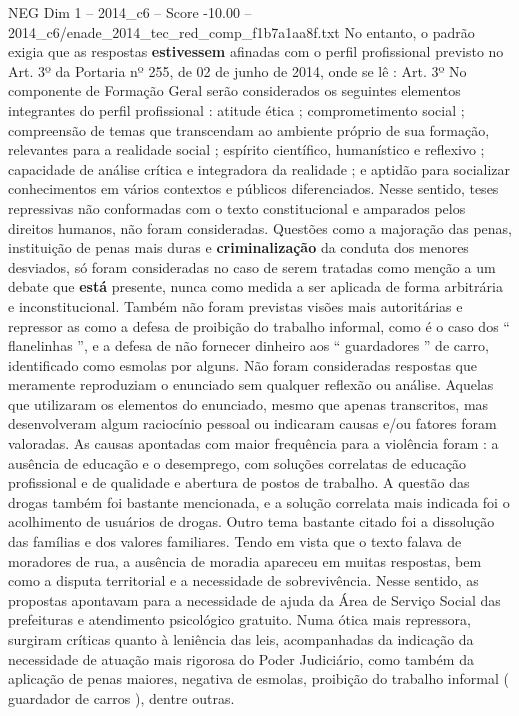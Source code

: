 \begin{textsample}{NEG Dim 1 – 2014\_c6 – Score -10.00 – 2014\_c6/enade\_2014\_tec\_red\_comp\_f1b7a1aa8f.txt}
No entanto, o padrão exigia que as respostas \textbf{estivessem} afinadas com o perfil profissional previsto no Art. 3º da Portaria nº 255, de 02 de junho de 2014, onde se lê : Art. 3º No componente de Formação Geral serão considerados os seguintes elementos integrantes do perfil profissional : atitude ética ; comprometimento social ; compreensão de temas que transcendam ao ambiente próprio de sua formação, relevantes para a realidade social ; espírito científico, humanístico e reflexivo ; capacidade de análise crítica e integradora da realidade ; e aptidão para socializar conhecimentos em vários contextos e públicos diferenciados.
Nesse sentido, teses repressivas não conformadas com o texto constitucional e amparados pelos direitos humanos, não foram consideradas.
Questões como a majoração das penas, instituição de penas mais duras e \textbf{criminalização} da conduta dos menores desviados, só foram consideradas no caso de serem tratadas como menção a um debate que \textbf{está} presente, nunca como medida a ser aplicada de forma arbitrária e inconstitucional.
Também não foram previstas visões mais autoritárias e repressor as como a defesa de proibição do trabalho informal, como é o caso dos “ flanelinhas ”, e a defesa de não fornecer dinheiro aos “ guardadores ” de carro, identificado como esmolas por alguns.
Não foram consideradas respostas que meramente reproduziam o enunciado sem qualquer reflexão ou análise.
Aquelas que utilizaram os elementos do enunciado, mesmo que apenas transcritos, mas desenvolveram algum raciocínio pessoal ou indicaram causas e/ou fatores foram valoradas.
As causas apontadas com maior frequência para a violência foram : a ausência de educação e o desemprego, com soluções correlatas de educação profissional e de qualidade e abertura de postos de trabalho.
A questão das drogas também foi bastante mencionada, e a solução correlata mais indicada foi o acolhimento de usuários de drogas.
Outro tema bastante citado foi a dissolução das famílias e dos valores familiares.
Tendo em vista que o texto falava de moradores de rua, a ausência de moradia apareceu em muitas respostas, bem como a disputa territorial e a necessidade de sobrevivência.
Nesse sentido, as propostas apontavam para a necessidade de ajuda da Área de Serviço Social das prefeituras e atendimento psicológico gratuito.
Numa ótica mais repressora, surgiram críticas quanto à leniência das leis, acompanhadas da indicação da necessidade de atuação mais rigorosa do Poder Judiciário, como também da aplicação de penas maiores, negativa de esmolas, proibição do trabalho informal ( guardador de carros ), dentre outras.

\end{textsample}
